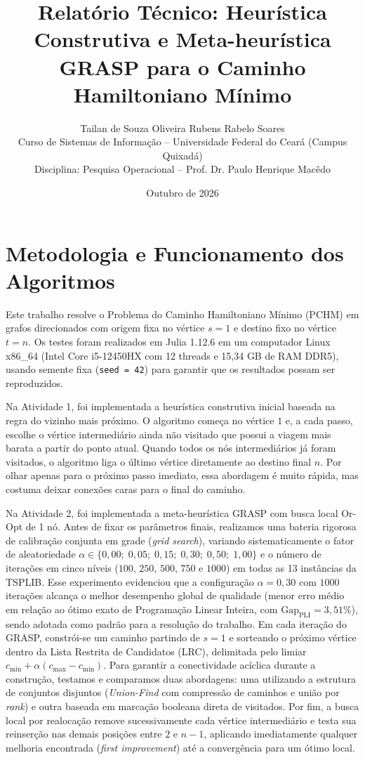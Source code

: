 \documentclass[10pt,a4paper]{article}
\title{\large\textbf{Relatório Técnico: Heurística Construtiva e Meta-heurística GRASP para o Caminho Hamiltoniano Mínimo}}
\author{Tailan de Souza Oliveira \quad Rubens Rabelo Soares \\
\small Curso de Sistemas de Informação -- Universidade Federal do Ceará (Campus Quixadá) \\
\small Disciplina: Pesquisa Operacional -- Prof. Dr. Paulo Henrique Macêdo}
\date{Outubro de 2026}
\begin{document}
\maketitle
\vspace{-1.8em}

\section{Metodologia e Funcionamento dos Algoritmos}
Este trabalho resolve o Problema do Caminho Hamiltoniano Mínimo (PCHM) em grafos direcionados com origem fixa no vértice $s = 1$ e destino fixo no vértice $t = n$. Os testes foram realizados em Julia 1.12.6 em um computador Linux x86\_64 (Intel Core i5-12450HX com 12 threads e 15,34 GB de RAM DDR5), usando semente fixa (\texttt{seed = 42}) para garantir que os resultados possam ser reproduzidos.

Na Atividade 1, foi implementada a heurística construtiva inicial baseada na regra do vizinho mais próximo. O algoritmo começa no vértice $1$ e, a cada passo, escolhe o vértice intermediário ainda não visitado que possui a viagem mais barata a partir do ponto atual. Quando todos os nós intermediários já foram visitados, o algoritmo liga o último vértice diretamente ao destino final $n$. Por olhar apenas para o próximo passo imediato, essa abordagem é muito rápida, mas costuma deixar conexões caras para o final do caminho.

Na Atividade 2, foi implementada a meta-heurística GRASP com busca local Or-Opt de 1 nó. Antes de fixar os parâmetros finais, realizamos uma bateria rigorosa de calibração conjunta em grade (\textit{grid search}), variando sistematicamente o fator de aleatoriedade $\alpha \in \{0,00;\; 0,05;\; 0,15;\; 0,30;\; 0,50;\; 1,00\}$ e o número de iterações em cinco níveis ($100$, $250$, $500$, $750$ e $1000$) em todas as 13 instâncias da TSPLIB. Esse experimento evidenciou que a configuração $\alpha = 0,30$ com $1000$ iterações alcança o melhor desempenho global de qualidade (menor erro médio em relação ao ótimo exato de Programação Linear Inteira, com $\text{Gap}_{\text{PLI}} = 3,51\%$), sendo adotada como padrão para a resolução do trabalho. Em cada iteração do GRASP, constrói-se um caminho partindo de $s = 1$ e sorteando o próximo vértice dentro da Lista Restrita de Candidatos (LRC), delimitada pelo limiar $c_{\min} + \alpha(c_{\max} - c_{\min})$. Para garantir a conectividade acíclica durante a construção, testamos e comparamos duas abordagens: uma utilizando a estrutura de conjuntos disjuntos (\textit{Union-Find} com compressão de caminhos e união por \textit{rank}) e outra baseada em marcação booleana direta de visitados. Por fim, a busca local por realocação remove sucessivamente cada vértice intermediário e testa sua reinserção nas demais posições entre $2$ e $n-1$, aplicando imediatamente qualquer melhoria encontrada (\textit{first improvement}) até a convergência para um ótimo local.
\end{document}
